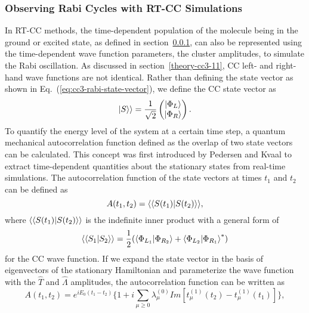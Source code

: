 \subsubsection{Observing Rabi Cycles with RT-CC Simulations} \label{theory-cc3-32}
In RT-CC methods, the time-dependent population of the molecule being in the ground or excited state, as defined in section~\ref{theory-cc3-32}, can also be represented using the time-dependent wave function parameters, the cluster amplitudes, to simulate the Rabi oscillation. As discussed in section~\ref{theory-cc3-11}, CC left- and right-hand wave functions are not identical. Rather than defining the state vector as shown in Eq.~(\ref{eq:cc3-rabi-state-vector}), we define the CC state vector as
\begin{equation}
| S \rangle \rangle = \frac{1}{\sqrt{2}} 
\begin{pmatrix}
| \Phi_{L} \rangle \\ | \Phi_{R} \rangle
\end{pmatrix}.
\end{equation}
To quantify the energy level of the system at a certain time step, a quantum mechanical autocorrelation function defined as the overlap of two state vectors can be calculated. This concept was first introduced by Pedersen and Kvaal to extract time-dependent quantities about the stationary states from real-time simulations.\cite{Pedersen2019} The autocorrelation function of the state vectors at times $t_{1}$ and $t_{2}$ can be defined as
\begin{equation}
A(t_{1}, t_{2}) = \langle \langle S(t_{1}) | S(t_{2}) \rangle \rangle,
\end{equation}
where $\langle \langle S(t_{1}) | S(t_{2}) \rangle \rangle$ is the indefinite inner product with a general form of
\begin{equation}
\langle \langle S_{1} | S_{2} \rangle \rangle = \frac{1}{2}(\langle\Phi_{L_{1}} |\Phi_{R_{2}} \rangle + {\langle\Phi_{L_{2}} |\Phi_{R_{1}} \rangle}^{*})
\end{equation}
for the CC wave function.
If we expand the state vector in the basis of eigenvectors of the stationary Hamiltonian and parameterize the wave function with the $\hat{T}$ and $\hat{\Lambda}$ amplitudes, the autocorrelation function can be written as
\begin{equation}
A(t_{1}, t_{2}) = e^{iE_{0}(t_{1}-t_{2})}\{ 1+ i \sum_{\mu \ge 0}\lambda_{\mu}^{(0)} Im[t_{\mu}^{(1)}(t_{2}) - t_{\mu}^{(1)}(t_{1})]  \},
\end{equation}
